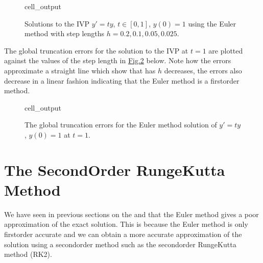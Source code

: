 \documentclass[letterpaper,10pt,english]{jupyterBook}
\begin{document}
\begin{figure}[htbp]
\centering
\capstart
\begin{sphinxVerbatimOutput}

\begin{sphinxuseclass}{cell_output}
\noindent{}

\end{sphinxuseclass}\end{sphinxVerbatimOutput}
\caption{Solutions to the IVP \(y'=ty\), \(t\in[0,1]\), \(y(0)=1\) using the Euler method with step lengths \(h=0.2, 0.1, 0.05, 0.025\).}\label{\detokenize{1_IVPs/1.3_Error_Analysis:euler-hvalues-figure}}\end{figure}

\sphinxAtStartPar
The global truncation errors for the solution to the IVP at \(t=1\) are plotted against the values of the step length in \hyperref[\detokenize{1_IVPs/1.3_Error_Analysis:euler-gte-figure}]{Fig.\@ \ref{\detokenize{1_IVPs/1.3_Error_Analysis:euler-gte-figure}}} below. Note how the errors approximate a straight line which show that has \(h\) decreases, the errors also decrease in a linear fashion indicating that the Euler method is a first\sphinxhyphen{}order method.

\begin{figure}[htbp]
\centering
\capstart
\begin{sphinxVerbatimOutput}

\begin{sphinxuseclass}{cell_output}
\noindent{}

\end{sphinxuseclass}\end{sphinxVerbatimOutput}
\caption{The global truncation errors for the Euler method solution of \(y'=t y\), \(y(0)=1\) at \(t=1\).}\label{\detokenize{1_IVPs/1.3_Error_Analysis:euler-gte-figure}}\end{figure}

\sphinxstepscope


\section{The Second\sphinxhyphen{}Order Runge\sphinxhyphen{}Kutta Method}
\label{\detokenize{1_IVPs/1.4_RK2:the-second-order-runge-kutta-method}}\label{\detokenize{1_IVPs/1.4_RK2:rk2-section}}\label{\detokenize{1_IVPs/1.4_RK2::doc}}
\sphinxAtStartPar
We have seen in previous sections on the {\hyperref[\detokenize{1_IVPs/1.2_Euler_Method:euler-method-section}]{}} and {\hyperref[\detokenize{1_IVPs/1.3_Error_Analysis:error-analysis-section}]{}} that the Euler method gives a poor approximation of the exact solution. This is because the Euler method is only first\sphinxhyphen{}order accurate and we can obtain a more accurate approximation of the solution using a second\sphinxhyphen{}order method such as the second\sphinxhyphen{}order Runge\sphinxhyphen{}Kutta method (RK2).
\end{document}
